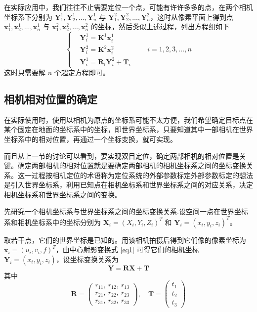 \documentclass{article}
\numberwithin{equation}{section}						%
\numberwithin{figure}{section}							%
\begin{document}
\begin{sloppypar}
	在实际应用中，我们往往不止需要定位一个点，可能有许许多多的点，在两个相机坐标系下分别为 ${\bm Y^1_1}, {\bm Y^1_2}, \dots, {\bm Y^1_n}$ 与 ${\bm Y^2_1}, {\bm Y^2_2}, \dots, {\bm Y^2_n}$，这时从像素平面上得到点 ${\bm x^1_1}, {\bm x^1_2}, \dots, {\bm x^1_n}$ 与 ${\bm x^2_1}, {\bm x^2_2}, \dots, {\bm x^2_n}$ 的坐标，然后类似上述过程，列出方程组如下
	\begin{equation}
		\left\{
		\begin{aligned}
			&{\bm Y^1_i} = {\bm K^1}{\bm x^1_i} \\
			&{\bm Y^2_i} = {\bm K^2}{\bm x^2_i} \\
			&{\bm Y^1_i} = {\bm R_i}{\bm Y^2_i} + {\bm T_i}
		\end{aligned}
		\right. \qquad i = 1, 2, 3, \dots, n
	\end{equation}
	这时只需要解 $n$ 个超定方程即可。
	\subsection{相机相对位置的确定}
	在实际使用时，使用以相机为原点的坐标系可能不太方便，我们希望确定目标点在某个固定在地面的坐标系中的坐标，即世界坐标系，只要知道其中一部相机在世界坐标系中的相对位置，再通过一个坐标变换，就可实现。
	
	而且从上一节的讨论可以看到，要实现双目定位，确定两部相机的相对位置是关键。确定两部相机的相对位置就是要确定两部相机的相机坐标系之间的坐标变换关系。这一过程按相机定位的术语称为定位系统的外部参数标定外部参数标定的想法是引入世界坐标系，利用已知点在相机坐标系和世界坐标系之间的对应关系，决定相机坐标系和世界坐标系之间的变换。
	
	先研究一个相机坐标系与世界坐标系之间的坐标变换关系.设空间一点在世界坐标系和相机坐标系中的坐标分别为 ${\bm X_i} = (X_i, Y_i, Z_i)^T$ 和 ${\bm Y_i} = (x_i, y_i, z_i)^T$。
	
	取若干点，它们的世界坐标是已知的。用该相机拍摄后得到它们像的像素坐标为 ${\bm x_i} = (u_i, v_i, f)^T$，由中心射影变换式 \ref{eq1} 可得它们的相机坐标 ${\bm Y_i} = (x_i, y_i, z_i)$，设坐标变换关系为
	\begin{equation}
		{\bm Y} = {\bm R}{\bm X} + {\bm T}
		\label{eq5}
	\end{equation}
	其中
	\begin{equation}
		{\bm R} = \left( 
		\begin{aligned}
			r_{11},\ r_{12},\ r_{13} \\
			r_{21},\ r_{22},\ r_{23} \\
			r_{31},\ r_{32},\ r_{33}
		\end{aligned}
		\right), \quad {\bm T} = \left(
		\begin{aligned}
			t_{1} \\
			t_{2} \\
			t_{3}
		\end{aligned}
		\right)
	\end{equation}
	

\end{sloppypar}
\end{document}
